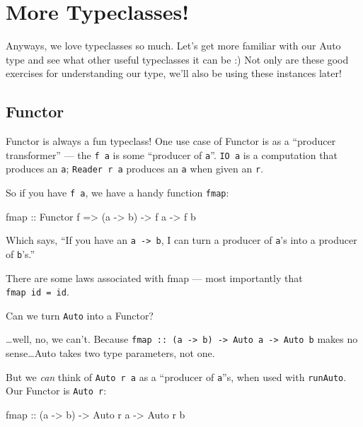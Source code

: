 \documentclass[]{article}
\newenvironment{Shaded}{}{}
\newcommand{\DataTypeTok}[1]{\textcolor[rgb]{0.56,0.13,0.00}{{#1}}}
\newcommand{\OtherTok}[1]{\textcolor[rgb]{0.00,0.44,0.13}{{#1}}}
\newcommand{\NormalTok}[1]{{#1}}
\begin{document}
\section{More Typeclasses!}\label{more-typeclasses}

Anyways, we love typeclasses so much. Let's get more familiar with our
Auto type and see what other useful typeclasses it can be :) Not only
are these good exercises for understanding our type, we'll also be using
these instances later!

\subsection{Functor}\label{functor}

Functor is always a fun typeclass! One use case of Functor is as a
``producer transformer'' --- the \texttt{f\ a} is some ``producer of
\texttt{a}''. \texttt{IO\ a} is a computation that produces an
\texttt{a}; \texttt{Reader\ r\ a} produces an \texttt{a} when given an
\texttt{r}.

So if you have \texttt{f\ a}, we have a handy function \texttt{fmap}:

\begin{Shaded}
\begin{Highlighting}[]
\NormalTok{fmap}\OtherTok{ ::} \DataTypeTok{Functor} \NormalTok{f }\OtherTok{=>} \NormalTok{(a }\OtherTok{->} \NormalTok{b) }\OtherTok{->} \NormalTok{f a }\OtherTok{->} \NormalTok{f b}
\end{Highlighting}
\end{Shaded}

Which says, ``If you have an \texttt{a\ -\textgreater{}\ b}, I can turn
a producer of \texttt{a}'s into a producer of \texttt{b}'s.''

There are some laws associated with fmap --- most importantly that
\texttt{fmap\ id\ =\ id}.

Can we turn \texttt{Auto} into a Functor?

\ldots{}well, no, we can't. Because
\texttt{fmap\ ::\ (a\ -\textgreater{}\ b)\ -\textgreater{}\ Auto\ a\ -\textgreater{}\ Auto\ b}
makes no sense\ldots{}Auto takes two type parameters, not one.

But we \emph{can} think of \texttt{Auto\ r\ a} as a ``producer of
\texttt{a}''s, when used with \texttt{runAuto}. Our Functor is
\texttt{Auto\ r}:

\begin{Shaded}
\begin{Highlighting}[]
\NormalTok{fmap}\OtherTok{ ::} \NormalTok{(a }\OtherTok{->} \NormalTok{b) }\OtherTok{->} \DataTypeTok{Auto} \NormalTok{r a }\OtherTok{->} \DataTypeTok{Auto} \NormalTok{r b}
\end{Highlighting}
\end{Shaded}
\end{document}
